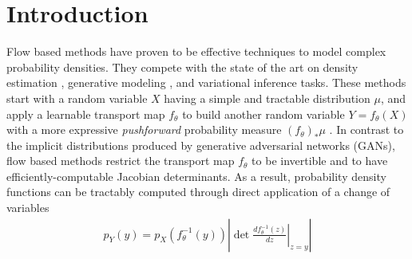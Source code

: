\documentclass[twoside]{article}
\theoremstyle{definition}
\theoremstyle{remark}
\begin{document}
\section{Introduction}
\label{sec:intro}


Flow based methods 
\citep{papamakarios2021normalizing}
have proven to be effective techniques to model complex
probability densities. They compete with the state of the art on
density estimation \citep{huang2018neural,durkan2019neural,jaini2020tails},
generative modeling \citep{chen2019residual,kingma2018glow}, and variational inference \citep{kingma2016improved,agrawal2020advances} tasks.
These methods start with a random variable $X$ having a simple and tractable
distribution $\mu$, and apply a learnable transport map $f_\theta$ to build
another random variable $Y = f_\theta(X)$ with a more expressive \emph{pushforward}
probability measure $(f_\theta)_\ast \mu$ \citep{papamakarios2021normalizing}.
In contrast to the implicit distributions \citep{huszar2017variational} produced by generative adversarial networks (GANs), flow based methods restrict the transport map $f_\theta$ to be invertible and to have efficiently-computable Jacobian determinants.
As a result, probability density functions can be tractably computed
through direct application of a change of variables
\begin{align}
    \label{eq:change-of-variable}
    p_{Y}(y)
      = p_{X}(f_\theta^{-1}(y)) \left\lvert \det
        \left.\frac{d f_\theta^{-1}(z)}{dz} \right\vert_{z=y}
      \right\rvert
\end{align}
\end{document}
